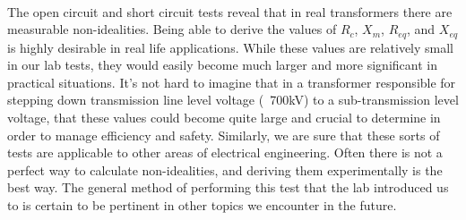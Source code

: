 \paragraph{} The open circuit and short circuit tests reveal that in real transformers there are
measurable non-idealities. Being able to derive the values of $R_{c}$, $X_{m}$, $R_{eq}$, and $X_{eq}$
is highly desirable in real life applications. While these values are relatively small in our lab tests,
they would easily become much larger and more significant in practical situations. It's not hard to imagine
that in a transformer responsible for stepping down transmission line level voltage (~700kV) to a
sub-transmission level voltage, that these values could become quite large and crucial to determine
in order to manage efficiency and safety. Similarly, we are sure that these sorts of tests are applicable to
other areas of electrical engineering. Often there is not a perfect way to calculate non-idealities,
and deriving them experimentally is the best way. The general method of performing this test that the
lab introduced us to is certain to be pertinent in other topics we encounter in the future.